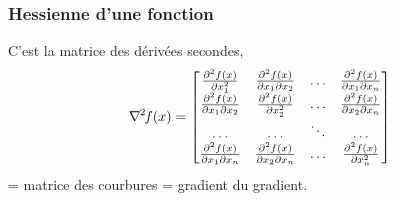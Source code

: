 \documentclass[12pt]{beamer}
\begin{document}
\begin{frame}
\begin{itemize}
\begin{frame}
\frametitle{Hessienne d'une fonction} 
C’est la matrice des dérivées secondes,
\begin{equation*}
\nabla^{{\mkern-1mu}2}{\mkern-2mu}{f}(x) = 
\begin{bmatrix}
\frac{\partial^2 f(x)}{\partial x_1^2} & \frac{\partial^2 f(x)}{\partial x_1 \partial x_2} & \ldots & \frac{\partial^2 f(x)}{\partial x_1 \partial x_n}\\ 
\frac{\partial^2 f(x)}{\partial x_1 \partial x_2} & \frac{\partial^2 f(x)}{\partial x_2^2} & \ldots & \frac{\partial^2 f(x)}{\partial x_2 \partial x_n}\\
\ldots & \ldots & \ddots & \ldots \\
\frac{\partial^2 f(x)}{\partial x_1 \partial x_n} & \frac{\partial^2 f(x)}{\partial x_2 \partial x_n} & \ldots & \frac{\partial^2 f(x)}{\partial x_n^2}
\end{bmatrix}
\end{equation*}
= matrice des courbures = gradient du gradient.
\end{frame}


\end{itemize}
\end{frame}
\end{document}
